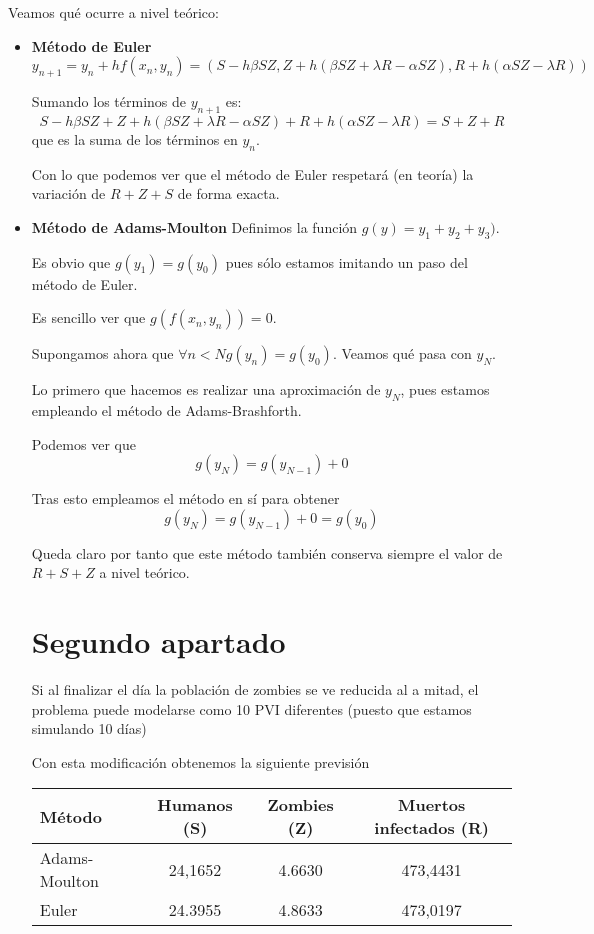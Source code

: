 \documentclass[nochap]{apuntes}
\begin{document}
Veamos qué ocurre a nivel teórico:
\begin{itemize}
\item \textbf{Método de Euler}
\[y_{n+1}=y_n+hf(x_n,y_n) = \left(S-hβSZ,Z+h(βSZ+λR-αSZ),R+h(αSZ-λR)\right)\]

Sumando los términos de $y_{n+1}$ es:
\[S-hβSZ+Z+h(βSZ+λR-αSZ)+R+h(αSZ-λR) = S+Z+R\]
que es la suma de los términos en $y_n$.

Con lo que podemos ver que el método de Euler respetará (en teoría) la variación de $R+Z+S$ de forma exacta.

\item \textbf{Método de Adams-Moulton}
Definimos la función $g(y)=y_1+y_2+y_3)$.

Es obvio que $g(y_1)=g(y_0)$ pues sólo estamos imitando un paso del método de Euler.

Es sencillo ver que $g(f(x_n,y_n))=0$.

Supongamos ahora que $\forall n < N g(y_n)=g(y_0)$. Veamos qué pasa con $y_{N}$.

Lo primero que hacemos es realizar una aproximación de $y_{N}$, pues estamos empleando el método de Adams-Brashforth.

Podemos ver que
\[g(y_{N})=g(y_{N-1})+0\]

Tras esto empleamos el método en sí para obtener
\[g(y_N)=g(y_{N-1})+0=g(y_0)\]

Queda claro por tanto que este método también conserva siempre el valor de $R+S+Z$ a nivel teórico.

\section{Segundo apartado}

Si al finalizar el día la población de zombies se ve reducida al a mitad, el problema puede modelarse como 10 PVI diferentes (puesto que estamos simulando 10 días)

Con esta modificación obtenemos la siguiente previsión

\begin{center}
\begin{tabular}{lccc}    \toprule
Método    & Humanos (S)  & Zombies (Z)  & Muertos infectados (R)  \\ \midrule
Adams-Moulton & 24,1652 & 4.6630 & 473,4431\\
Euler & 24.3955 & 4.8633  & 473,0197\\\bottomrule
 \hline
\end{tabular}
\end{center}


\end{itemize}
\end{document}
